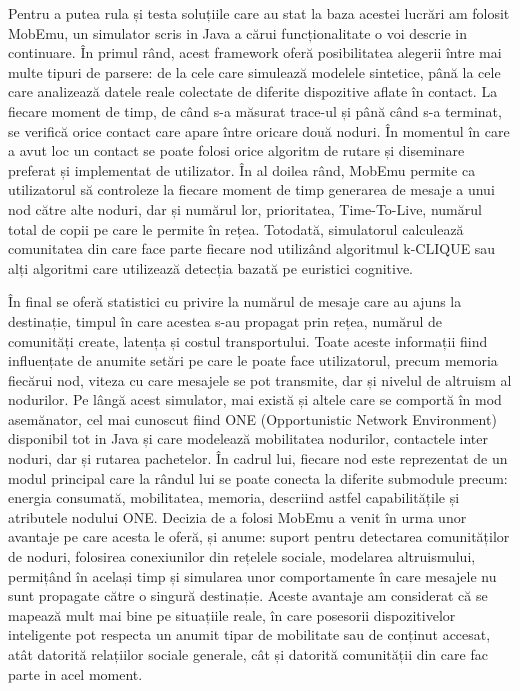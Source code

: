 \documentclass[12pt,a4paper]{report}
\begin{document}
Pentru a putea rula și testa soluțiile care au stat la baza acestei lucrări am folosit MobEmu, un simulator scris in Java a cărui funcționalitate o voi descrie in continuare. În primul rând, acest framework oferă posibilitatea alegerii între mai multe tipuri de parsere: de la cele care simulează modelele sintetice, până la cele care analizează datele reale colectate de diferite dispozitive aflate în contact. La fiecare moment de timp, de când s-a măsurat trace-ul și până când s-a terminat, se verifică orice contact care apare între oricare două noduri. În momentul în care a avut loc un contact se poate folosi orice algoritm de rutare și diseminare preferat și implementat de utilizator. 
În al doilea rând, MobEmu permite ca utilizatorul să controleze la fiecare moment de timp generarea de mesaje a unui nod către alte noduri, dar și numărul lor, prioritatea, Time-To-Live, numărul total de copii pe care le permite în rețea. Totodată, simulatorul calculează comunitatea din care face parte fiecare nod utilizând algoritmul k-CLIQUE sau alți algoritmi care utilizează detecția bazată pe euristici cognitive. 

În final se oferă statistici cu privire la numărul de mesaje care au ajuns la destinație, timpul în care acestea s-au propagat prin rețea, numărul de comunități create, latența și costul transportului. Toate aceste informații fiind influențate de anumite setări pe care le poate face utilizatorul, precum memoria fiecărui nod, viteza cu care mesajele se pot transmite, dar și nivelul de altruism al nodurilor.
Pe lângă acest simulator, mai există și altele care se comportă în mod asemănator, cel mai cunoscut fiind ONE (Opportunistic Network Environment)~\cite{OneArticle} disponibil tot in Java și care modelează mobilitatea nodurilor, contactele inter noduri, dar și rutarea pachetelor. În cadrul lui, fiecare nod este reprezentat de un modul principal care la rândul lui se poate conecta la diferite submodule precum: energia consumată, mobilitatea, memoria, descriind astfel capabilitățile și atributele nodului ONE. Decizia de a folosi MobEmu a venit în urma unor avantaje pe care acesta le oferă, și anume: suport pentru detectarea comunităților de noduri, folosirea conexiunilor din rețelele sociale, modelarea altruismului, permițând în același timp și simularea unor comportamente în care mesajele nu sunt propagate către o singură destinație. Aceste avantaje am considerat că se mapează mult mai bine pe situațiile reale, în care posesorii dispozitivelor inteligente pot respecta un anumit tipar de mobilitate sau de conținut accesat, atât datorită relațiilor sociale generale, cât și datorită comunității din care fac parte in acel moment.  
\end{document}
